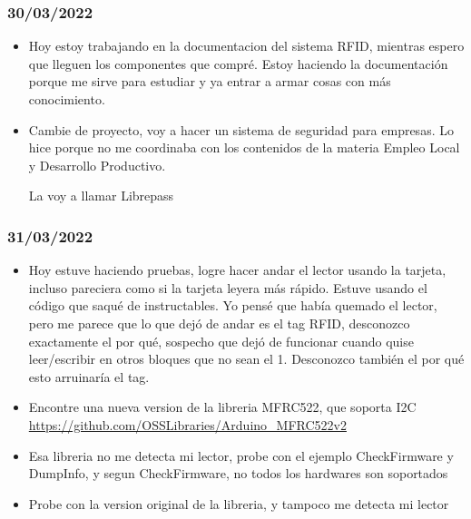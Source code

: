 \documentclass[../informe_krapp.tex]{subfiles}
\begin{document}
\subsubsection*{30/03/2022}
\begin{itemize}
	\item Hoy estoy trabajando en la documentacion del sistema RFID, mientras espero
	      que lleguen los componentes que compré. Estoy haciendo la documentación porque
	      me sirve para estudiar y ya entrar a armar cosas con más conocimiento.
	\item Cambie de proyecto, voy a hacer un sistema de seguridad para empresas.
	      Lo hice porque no me coordinaba con los contenidos de la materia
	      Empleo Local y Desarrollo Productivo.

	      La voy a llamar Librepass
\end{itemize}

\subsubsection*{31/03/2022}
\begin{itemize}
	\item Hoy estuve haciendo pruebas, logre hacer andar el lector usando la tarjeta,
	      incluso pareciera como si la tarjeta leyera más rápido. Estuve usando el
	      código que saqué de instructables.
	      Yo pensé que había quemado el lector, pero me parece que lo que
	      dejó de andar es el tag RFID, desconozco exactamente el por qué, sospecho
	      que dejó de funcionar cuando quise leer/escribir en otros bloques
	      que no sean el 1. Desconozco también el por qué esto arruinaría el tag.
	\item Encontre una nueva version de la libreria MFRC522, que soporta I2C
	      \url{https://github.com/OSSLibraries/Arduino_MFRC522v2}
	\item Esa libreria no me detecta mi lector, probe con el ejemplo CheckFirmware y
	      DumpInfo, y segun CheckFirmware, no todos los hardwares son soportados
	\item Probe con la version original de la libreria, y tampoco me detecta mi lector
\end{itemize}
\end{document}
